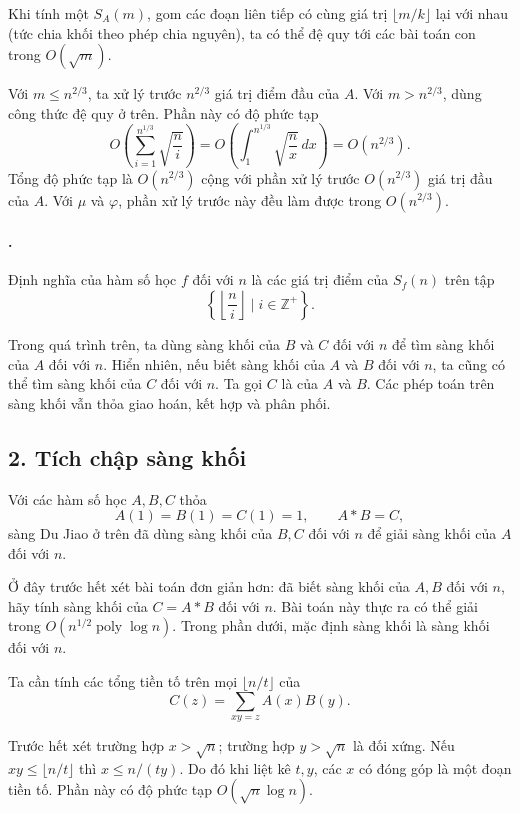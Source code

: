 \documentclass[11pt]{article}
\begin{document}
Khi tính một \(S_A(m)\), gom các đoạn liên tiếp có cùng giá trị
\(\lfloor m/k\rfloor\) lại với nhau (tức chia khối theo phép chia nguyên), ta
có thể đệ quy tới các bài toán con trong \(O(\sqrt m)\).

Với \(m\le n^{2/3}\), ta xử lý trước \(n^{2/3}\) giá trị điểm đầu của \(A\).
Với \(m>n^{2/3}\), dùng công thức đệ quy ở trên. Phần này có độ phức tạp
\[
  O\left(\sum_{i=1}^{n^{1/3}}\sqrt{\frac{n}{i}}\right)
  = O\left(\int_1^{n^{1/3}}\sqrt{\frac{n}{x}}\,dx\right)
  = O(n^{2/3}).
\]
Tổng độ phức tạp là \(O(n^{2/3})\) cộng với phần xử lý trước \(O(n^{2/3})\) giá
trị đầu của \(A\). Với \(\mu\) và \(\varphi\), phần xử lý trước này đều làm
được trong \(O(n^{2/3})\).

\paragraph{.}
Định nghĩa  của hàm số học \(f\) đối với \(n\) là các giá trị
điểm của \(S_f(n)\) trên tập
\[
  \left\{\left\lfloor\frac{n}{i}\right\rfloor\mid i\in\mathbb Z^+\right\}.
\]

Trong quá trình trên, ta dùng sàng khối của \(B\) và \(C\) đối với \(n\) để
tìm sàng khối của \(A\) đối với \(n\). Hiển nhiên, nếu biết sàng khối của
\(A\) và \(B\) đối với \(n\), ta cũng có thể tìm sàng khối của \(C\) đối với
\(n\). Ta gọi \(C\) là  của \(A\) và \(B\). Các phép
toán trên sàng khối vẫn thỏa giao hoán, kết hợp và phân phối.

\subsection*{2. Tích chập sàng khối}

Với các hàm số học \(A,B,C\) thỏa
\[
  A(1)=B(1)=C(1)=1,\qquad A*B=C,
\]
sàng Du Jiao ở trên đã dùng sàng khối của \(B,C\) đối với \(n\) để giải sàng
khối của \(A\) đối với \(n\).

Ở đây trước hết xét bài toán đơn giản hơn: đã biết sàng khối của \(A,B\) đối
với \(n\), hãy tính sàng khối của \(C=A*B\) đối với \(n\). Bài toán này thực
ra có thể giải trong \(O(n^{1/2}\operatorname{poly}\log n)\). Trong phần dưới,
mặc định sàng khối là sàng khối đối với \(n\).

Ta cần tính các tổng tiền tố trên mọi \(\lfloor n/t\rfloor\) của
\[
  C(z)=\sum_{xy=z} A(x)B(y).
\]

Trước hết xét trường hợp \(x>\sqrt n\); trường hợp \(y>\sqrt n\) là đối xứng.
Nếu \(xy\le\lfloor n/t\rfloor\) thì \(x\le n/(ty)\). Do đó khi liệt kê
\(t,y\), các \(x\) có đóng góp là một đoạn tiền tố. Phần này có độ phức tạp
\(O(\sqrt n\log n)\).
\end{document}

